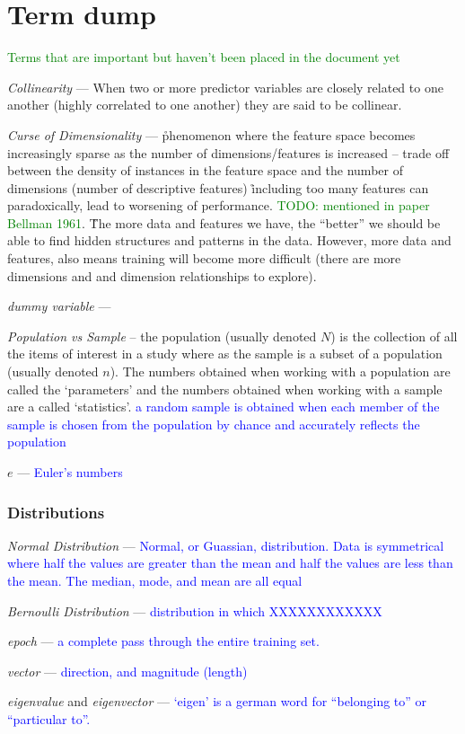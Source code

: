 \chapter{Term dump}

\textcolor{green}{Terms that are important but haven't been placed in the document yet}

\emph{Collinearity} --- When two or more predictor variables are closely related to one another (highly correlated to one another) they are said to be collinear.

\emph{Curse of Dimensionality} --- \r{phenomenon where the feature space becomes increasingly sparse as the number of dimensions/features is increased -- trade off between the density of instances in the feature space and the number of dimensions (number of descriptive features) \r{including too many features can paradoxically, lead to worsening of performance.} \textcolor{green}{TODO: mentioned in paper Bellman 1961}}. \r{The more data and features we have, the ``better'' we should be able to find hidden structures and patterns in the data. However, more data and features, also means training will become more difficult (there are more dimensions and and dimension relationships to explore).}

\emph{dummy variable} ---


\emph{Population vs Sample} -- the population (usually denoted $N$) is the collection of all the items of interest in a study where as the sample is a subset of a population (usually denoted $n$). The numbers obtained when working with a population are called the `parameters' and the numbers obtained when working with a sample are a called `statistics'. \textcolor{blue}{a random sample is obtained when each member of the sample is chosen from the population by chance and accurately reflects the population}

\emph{$e$} --- \textcolor{blue}{Euler's numbers}

\subsection{Distributions}

\emph{Normal Distribution} --- \textcolor{blue}{Normal, or Guassian, distribution. Data is symmetrical where half the values are greater than the mean and half the values are less than the mean. The median, mode, and mean are all equal}

\emph{Bernoulli Distribution} --- \textcolor{blue}{distribution in which XXXXXXXXXXXX}

\emph{epoch} --- \textcolor{blue}{a complete pass through the entire training set.}

\emph{vector} --- \textcolor{blue}{direction, and magnitude (length)}

\emph{eigenvalue} and \emph{eigenvector} --- \textcolor{blue}{`eigen' is a german word for ``belonging to'' or ``particular to''.} 